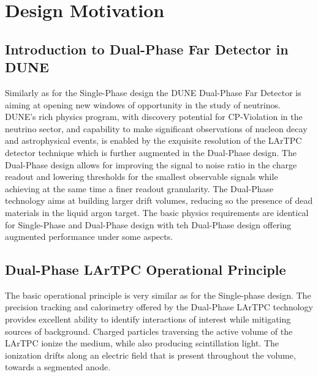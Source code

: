 \chapter{Design Motivation}
\label{ch:fddp-design}

\section{Introduction to Dual-Phase Far Detector in DUNE}
\label{sec:fddp-design-highlight}

Similarly as for the Single-Phase design the DUNE Dual-Phase Far Detector is aiming at opening new windows of opportunity in the study
of neutrinos.  DUNE's rich physics program, with discovery potential for CP-Violation in the neutrino sector, and capability to make
significant observations of nucleon decay and astrophysical events, is enabled by the exquisite resolution of the LArTPC detector technique which is further augmented in the Dual-Phase design. The Dual-Phase design allows for improving the signal to noise ratio in the charge readout and lowering thresholds for the smallest observable signals while achieving at the same time a finer readout granularity.  The Dual-Phase technology aims at building larger drift volumes, reducing so the presence of dead materials in the liquid argon target. The basic physics requirements are identical for Single-Phase and Dual-Phase design with teh Dual-Phase design offering augmented performance under some aspects.


\section{Dual-Phase LArTPC Operational Principle}
\label{sec:fddp-operational-principle}

The basic operational principle is very similar as for the Single-phase design. The precision tracking and calorimetry offered by the Dual-Phase LArTPC
technology provides excellent ability to identify interactions of interest while mitigating sources of background.  Charged particles traversing the active volume of the LArTPC ionize the medium, while also producing scintillation light.  The ionization drifts along an electric field that is present throughout the volume, towards a segmented anode.

